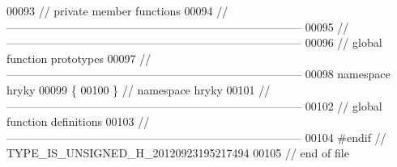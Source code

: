 \begin{DoxyCode}
00093 \textcolor{comment}{// private member functions}
00094 \textcolor{comment}{//
      ------------------------------------------------------------------------------}
00095 \textcolor{comment}{//
      ------------------------------------------------------------------------------}
00096 \textcolor{comment}{// global function prototypes}
00097 \textcolor{comment}{//
      ------------------------------------------------------------------------------}
00098 \textcolor{keyword}{namespace }hryky
00099 \{
00100 \} \textcolor{comment}{// namespace hryky}
00101 \textcolor{comment}{//
      ------------------------------------------------------------------------------}
00102 \textcolor{comment}{// global function definitions}
00103 \textcolor{comment}{//
      ------------------------------------------------------------------------------}
00104 \textcolor{preprocessor}{#endif // TYPE\_IS\_UNSIGNED\_H\_20120923195217494}
00105 \textcolor{preprocessor}{}\textcolor{comment}{// end of file}
\end{DoxyCode}
